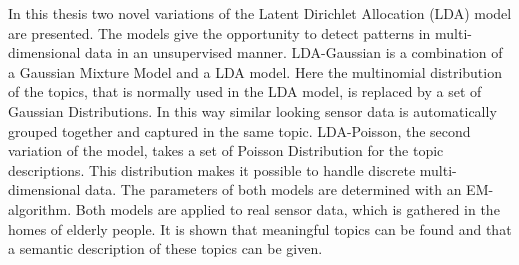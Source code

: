 In this thesis two novel variations of the Latent Dirichlet Allocation (LDA) model are presented. The models give the opportunity to detect patterns in multi-dimensional data in an unsupervised manner. LDA-Gaussian is a combination of a Gaussian Mixture Model and a LDA model. Here the multinomial distribution of the topics, that is normally used in the LDA model, is replaced by a set of Gaussian Distributions. In this way similar looking sensor data is automatically grouped together and captured in the same topic.
LDA-Poisson, the second variation of the model, takes a set of Poisson Distribution for the topic descriptions. This distribution makes it possible to handle discrete multi-dimensional data. The parameters of both models are determined with an EM-algorithm.
Both models are applied to real sensor data, which is gathered in the homes of elderly people. It is shown that meaningful topics can be found and that a semantic description of these topics can be given.